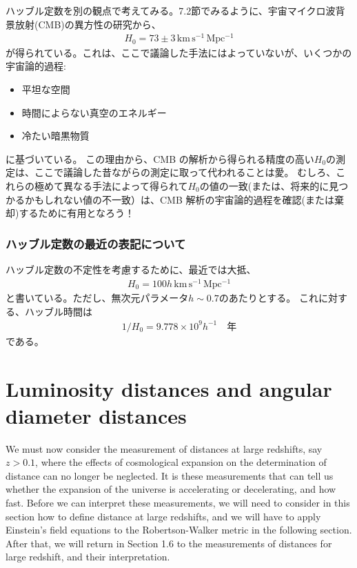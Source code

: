\documentclass[12pt,a4paper]{article}
\theoremstyle{plain}
\theoremstyle{break}
\begin{document}
ハッブル定数を別の観点で考えてみる。7.2節でみるように、宇宙マイクロ波背景放射(CMB)の異方性の研究から、
\begin{align}
  H_0 = 73 \pm 3  \,\mathrm{km\,s^{-1}\,Mpc^{-1}}
\end{align}
が得られている。これは、ここで議論した手法にはよっていないが、いくつかの宇宙論的過程:
\begin{itemize}
  \item 平坦な空間
  \item 時間によらない真空のエネルギー
  \item 冷たい暗黒物質
\end{itemize}
に基づいている。
この理由から、CMB の解析から得られる精度の高い$H_0$の測定は、ここで議論した昔ながらの測定に取って代われることは愛。
むしろ、これらの極めて異なる手法によって得られて$H_0$の値の一致(または、将来的に見つかるかもしれない値の不一致）は、CMB 解析の宇宙論的過程を確認(または棄却)するために有用となろう！

\subsubsection{ハッブル定数の最近の表記について}
ハッブル定数の不定性を考慮するために、最近では大抵、
\begin{align}
  H_0 =  100 h  \,\mathrm{km\,s^{-1}\,Mpc^{-1}}
\end{align}
と書いている。ただし、無次元パラメータ$h \sim 0.7$のあたりとする。
これに対する、ハッブル時間は
\begin{align}
  1/H_0 = 9.778 \times 10^9 h^{-1} \quad \text{年}
\end{align}
である。

\section{Luminosity distances and angular diameter distances}
We must now consider the measurement of distances at large redshifts, say $z > 0.1$,
where the effects of cosmological expansion on the determination of distance can no longer be neglected.
It is these measurements that can tell us whether the expansion of the universe is accelerating or decelerating, and how fast.
Before we can interpret these measurements, we will need to consider in this section how to define distance at large redshifts, and we will have to apply Einstein's field equations to the Robertson-Walker metric in the following section.
After that, we will return in Section 1.6 to the measurements of distances for large redshift, and their interpretation.
\end{document}
